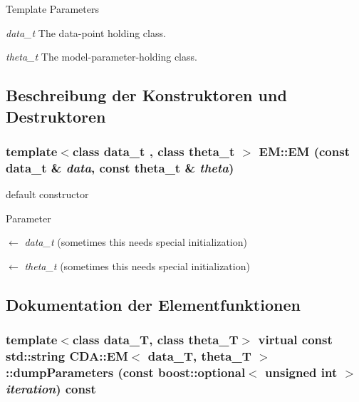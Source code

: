 \begin{DoxyTemplParams}{Template Parameters}
\item[{\em data\_\-t}]The data-\/point holding class. \item[{\em theta\_\-t}]The model-\/parameter-\/holding class. \end{DoxyTemplParams}


\subsection{Beschreibung der Konstruktoren und Destruktoren}
\hypertarget{classCDA_1_1EM_a1b30d405dee72fbf3ef58efffb52add4}{
\subsubsection[{EM}]{\setlength{\rightskip}{0pt plus 5cm}template$<$class data\_\-t , class theta\_\-t $>$ EM::EM (const {\bf data\_\-t} \& {\em data}, \/  const theta\_\-t \& {\em theta})}}
\label{classCDA_1_1EM_a1b30d405dee72fbf3ef58efffb52add4}


default constructor 


\begin{DoxyParams}{Parameter}
\item[\mbox{$\leftarrow$} {\em data\_\-t}](sometimes this needs special initialization) \item[\mbox{$\leftarrow$} {\em theta\_\-t}](sometimes this needs special initialization) \end{DoxyParams}


\subsection{Dokumentation der Elementfunktionen}
\hypertarget{classCDA_1_1EM_ad2deb0f1d94dc57a6e431caebeb34cbe}{
\subsubsection[{dumpParameters}]{\setlength{\rightskip}{0pt plus 5cm}template$<$class data\_\-T, class theta\_\-T$>$ virtual const std::string {\bf CDA::EM}$<$ data\_\-T, theta\_\-T $>$::dumpParameters (const boost::optional$<$ unsigned int $>$ {\em iteration}) const}}
\label{classCDA_1_1EM_ad2deb0f1d94dc57a6e431caebeb34cbe}


